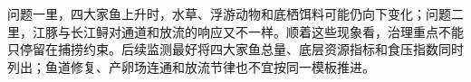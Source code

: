 问题一里，四大家鱼上升时，水草、浮游动物和底栖饵料可能仍向下变化；问题二里，江豚与长江鲟对通道和放流的响应又不一样。顺着这些现象看，治理重点不能只停留在捕捞约束。后续监测最好将四大家鱼总量、底层资源指标和食压指数同时列出；鱼道修复、产卵场连通和放流节律也不宜按同一模板推进。
